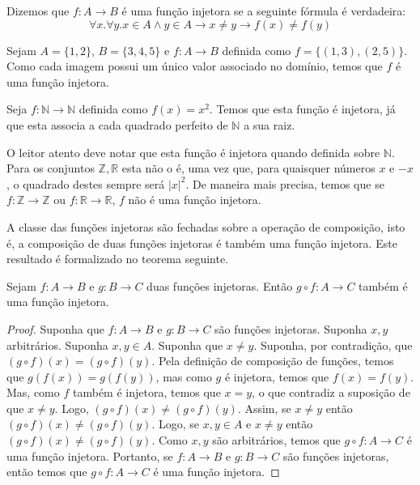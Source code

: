 \begin{Definition}
Dizemos que $f : A \to B$ é uma função injetora se a seguinte fórmula
é verdadeira:
\[
\forall x. \forall y. x\in A \land y \in A \to x \neq y \to f (x) \neq f(y)
\]
\end{Definition}

\begin{Example}
Sejam $A = \{1,2\}$, $B =\{3,4,5\}$ e $f : A \to B$ definida como $f =
\{(1,3),(2,5)\}$. Como cada imagem possui um único valor associado no
domínio, temos que $f$ é uma função injetora.
\end{Example}
\begin{Example}
Seja $f : \mathbb{N} \to \mathbb{N}$ definida como $f(x) = x^2$. Temos
que esta função é injetora, já que esta associa a cada quadrado
perfeito de $\mathbb{N}$ a sua raiz.
\end{Example}

O leitor atento deve notar que esta função é injetora quando definida
sobre $\mathbb{N}$. Para os conjuntos $\mathbb{Z},\mathbb{R}$ esta não
o é, uma vez que, para quaisquer números $x$ e $-x$, o quadrado destes
sempre será $|x|^2$. De maneira mais precisa, temos que se $f :
\mathbb{Z} \to \mathbb{Z}$ ou $f : \mathbb{R}\to\mathbb{R}$, $f$ não é
uma função injetora.

A classe das funções injetoras são fechadas sobre a operação de
composição, isto é, a composição de duas funções injetoras é também
uma função injetora. Este resultado é formalizado no teorema seguinte.

\begin{Theorem}\label{inj-compose}
Sejam $f : A \to B$ e $g : B \to C$ duas funções injetoras. Então $g
\circ f : A \to C$ também é uma função injetora.
\end{Theorem}
\begin{proof}
Suponha que $f : A \to B$ e $g : B \to C$ são funções
injetoras. Suponha $x,y$ arbitrários. Suponha $x,y \in A$. Suponha que
$x \neq y$. Suponha, por contradição, que $(g \circ f)(x) = (g\circ
f)(y)$. Pela definição de composição de funções, temos que $g(f(x)) =
g (f(y))$, mas como $g$ é injetora, temos que $f(x) = f(y)$. Mas, como
$f$ também é injetora, temos que $x = y$,  o que contradiz a suposição
de que $x \neq y$. Logo, $(g \circ f)(x) \neq (g \circ f)(y)$. Assim,
se $x\neq y$ então $(g \circ f)(x) \neq (g \circ f)(y)$. Logo, se $x,y
\in A$ e $x\neq y$ então $(g \circ f)(x) \neq (g \circ f)(y)$. Como
$x,y$ são arbitrários, temos que $g \circ f : A \to C$ é uma função
injetora. Portanto, se $f : A \to B$ e $g : B \to C$ são funções
injetoras, então temos que $g \circ f : A \to C$ é uma função injetora.
\end{proof}

